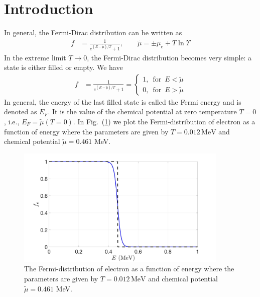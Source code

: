 \documentclass[sn-mathphys,Numbered]{sn-jnl}
\theoremstyle{thmstyleone}%
\theoremstyle{thmstyletwo}%
\theoremstyle{thmstylethree}%
\begin{document}
\section{Introduction}\label{sec1}

In general, the Fermi-Dirac distribution can be written as
\begin{align}
\label{Fermi_exact}
f&=\frac{1}{e^{(E-\tilde{\mu})/T}+1},\qquad\tilde\mu=\pm\mu_e+T\ln\Upsilon
\end{align}
In the extreme limit $T\rightarrow0$, the Fermi-Dirac distribution becomes very simple: a state is either filled or empty. We have
\begin{align}
f&=\frac{1}{e^{(E-\tilde{\mu})/T}+1}=\left\{\begin{array}{c}1,\,\,\,\mathrm{for}\,\,\,{E}<\tilde{\mu} \\0,\,\,\,\mathrm{for}\,\,\, {E}>\tilde{\mu}\end{array}\right.
\end{align}
In general, the energy of the last filled state is called the Fermi energy and is denoted as $E_F$. It is the value of the chemical potential at zero temperature $T=0$, i.e., $E_F=\tilde\mu(T = 0)$. In Fig.~(\ref{Electron_001}) we plot the Fermi-distribution of electron as a function of energy where the parameters are given by $T=0.012\,\mathrm{MeV}$ and chemical potential $\tilde\mu=0.461$ MeV.

\begin{figure}[h]
\begin{center}
\includegraphics[width=0.9\textwidth]{./plot/Electron_distribution001}
\caption{The Fermi-distribution of electron as a function of energy where the parameters are given by $T=0.012\,\mathrm{MeV}$ and chemical potential $\tilde\mu=0.461$ MeV.}
\label{Electron_001}
\end{center}
\end{figure}
\end{document}
